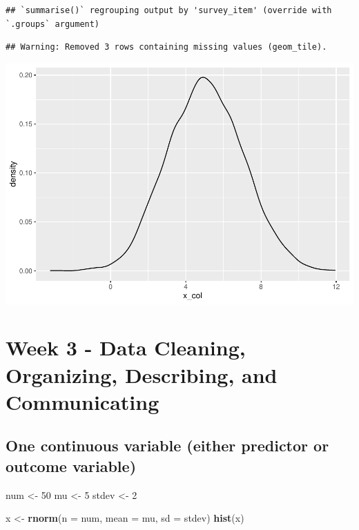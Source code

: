 \documentclass[
]{book}
\newenvironment{Shaded}{\begin{snugshade}}{\end{snugshade}}
\newcommand{\DataTypeTok}[1]{\textcolor[rgb]{0.13,0.29,0.53}{#1}}
\newcommand{\DecValTok}[1]{\textcolor[rgb]{0.00,0.00,0.81}{#1}}
\newcommand{\KeywordTok}[1]{\textcolor[rgb]{0.13,0.29,0.53}{\textbf{#1}}}
\newcommand{\NormalTok}[1]{#1}
\newcommand{\StringTok}[1]{\textcolor[rgb]{0.31,0.60,0.02}{#1}}
\begin{document}
\begin{verbatim}
## `summarise()` regrouping output by 'survey_item' (override with `.groups` argument)
\end{verbatim}

\begin{verbatim}
## Warning: Removed 3 rows containing missing values (geom_tile).
\end{verbatim}

\includegraphics{test_course_notes_files/figure-latex/unnamed-chunk-14-1.pdf}

\hypertarget{week-3---data-cleaning-organizing-describing-and-communicating}{%
\chapter{Week 3 - Data Cleaning, Organizing, Describing, and Communicating}\label{week-3---data-cleaning-organizing-describing-and-communicating}}

\hypertarget{one-continuous-variable-either-predictor-or-outcome-variable}{%
\section{One continuous variable (either predictor or outcome variable)}\label{one-continuous-variable-either-predictor-or-outcome-variable}}

\begin{Shaded}
\begin{Highlighting}[]
\NormalTok{num \textless{}{-}}\StringTok{ }\DecValTok{50}
\NormalTok{mu \textless{}{-}}\StringTok{ }\DecValTok{5}
\NormalTok{stdev \textless{}{-}}\StringTok{ }\DecValTok{2}

\NormalTok{x \textless{}{-}}\StringTok{ }\KeywordTok{rnorm}\NormalTok{(}\DataTypeTok{n =}\NormalTok{ num, }\DataTypeTok{mean =}\NormalTok{ mu, }\DataTypeTok{sd =}\NormalTok{ stdev)}
\KeywordTok{hist}\NormalTok{(x)}
\end{Highlighting}
\end{Shaded}
\end{document}
